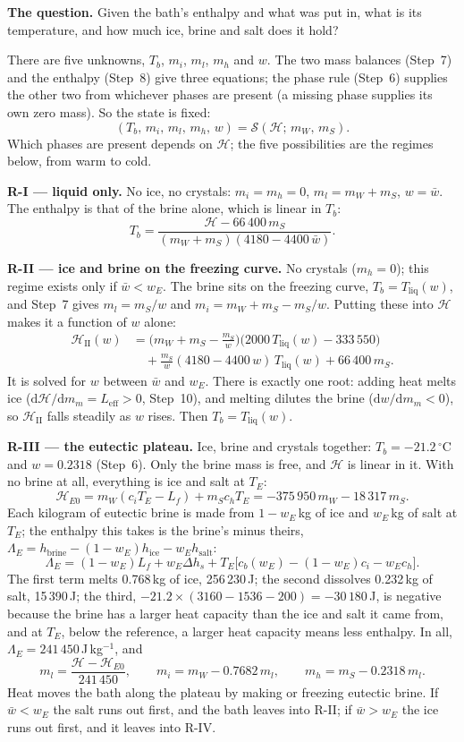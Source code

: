 \documentclass[11pt,a4paper]{article}
\newcommand{\dd}{\mathrm{d}}
\newcommand{\Hb}{\mathcal{H}}
\newcommand{\Tliq}{T_{\mathrm{liq}}}
\newcommand{\Leff}{L_{\mathrm{eff}}}
\newcommand{\dC}{\,{}^{\circ}\mathrm{C}}
\newcommand{\sub}[1]{\par\smallskip\noindent\textbf{#1}\enspace}
\begin{document}
\textbf{The question.} Given the bath's enthalpy and what was put in, what is its temperature, and how
much ice, brine and salt does it hold?

There are five unknowns, $T_b$, $m_i$, $m_l$, $m_h$ and $w$. The two mass balances (Step~7) and the
enthalpy (Step~8) give three equations; the phase rule (Step~6) supplies the other two from whichever
phases are present (a missing phase supplies its own zero mass). So the state is fixed:
\[ (T_b,\,m_i,\,m_l,\,m_h,\,w) = \mathcal S(\Hb;\,m_W,\,m_S). \]
Which phases are present depends on $\Hb$; the five possibilities are the regimes below, from warm to cold.

\sub{R-I --- liquid only.} No ice, no crystals: $m_i=m_h=0$, $m_l = m_W+m_S$, $w=\bar w$. The enthalpy
is that of the brine alone, which is linear in $T_b$:
\[ T_b = \frac{\Hb - 66\,400\,m_S}{(m_W+m_S)(4180 - 4400\,\bar w)}. \]

\sub{R-II --- ice and brine on the freezing curve.} No crystals ($m_h=0$); this regime exists only if
$\bar w<w_E$. The brine sits on the freezing curve, $T_b = \Tliq(w)$, and Step~7 gives $m_l = m_S/w$ and
$m_i = m_W + m_S - m_S/w$. Putting these into $\Hb$ makes it a function of $w$ alone:
\begin{align*}
\Hb_{\mathrm{II}}(w) &= \Big(m_W+m_S-\frac{m_S}{w}\Big)\big(2000\,\Tliq(w) - 333\,550\big)\\
&\quad + \frac{m_S}{w}(4180 - 4400\,w)\,\Tliq(w) + 66\,400\,m_S .
\end{align*}
It is solved for $w$ between $\bar w$ and $w_E$. There is exactly one root: adding heat melts ice
($\dd\Hb/\dd m_m = \Leff > 0$, Step~10), and melting dilutes the brine ($\dd w/\dd m_m < 0$), so $\Hb_{\mathrm{II}}$
falls steadily as $w$ rises. Then $T_b = \Tliq(w)$.

\sub{R-III --- the eutectic plateau.} Ice, brine and crystals together: $T_b = -21.2\dC$ and $w = 0.2318$
(Step~6). Only the brine mass is free, and $\Hb$ is linear in it. With no brine at all, everything is ice
and salt at $T_E$:
\[
\Hb_{E0} = m_W(c_iT_E - L_f) + m_Sc_hT_E = -375\,950\,m_W - 18\,317\,m_S .
\]
Each kilogram of eutectic brine is made from $1-w_E$\,kg of ice and $w_E$\,kg of salt at $T_E$; the
enthalpy this takes is the brine's minus theirs, $\Lambda_E = h_{\mathrm{brine}} - (1-w_E)h_{\mathrm{ice}} - w_Eh_{\mathrm{salt}}$:
\[
\Lambda_E = (1-w_E)L_f + w_E\Delta h_s + T_E\big[c_b(w_E) - (1-w_E)c_i - w_Ec_h\big] .
\]
The first term melts 0.768\,kg of ice, 256\,230\,J; the second dissolves 0.232\,kg of salt, 15\,390\,J; the
third, $-21.2\times(3160 - 1536 - 200) = -30\,180$\,J, is negative because the brine has a larger heat
capacity than the ice and salt it came from, and at $T_E$, below the reference, a larger heat capacity
means less enthalpy. In all, $\Lambda_E = 241\,450$\,J\,kg$^{-1}$, and
\[
m_l = \frac{\Hb - \Hb_{E0}}{241\,450},\qquad m_i = m_W - 0.7682\,m_l,\qquad m_h = m_S - 0.2318\,m_l .
\]
Heat moves the bath along the plateau by making or freezing eutectic brine. If $\bar w<w_E$ the salt runs
out first, and the bath leaves into R-II; if $\bar w>w_E$ the ice runs out first, and it leaves into R-IV.
\end{document}
